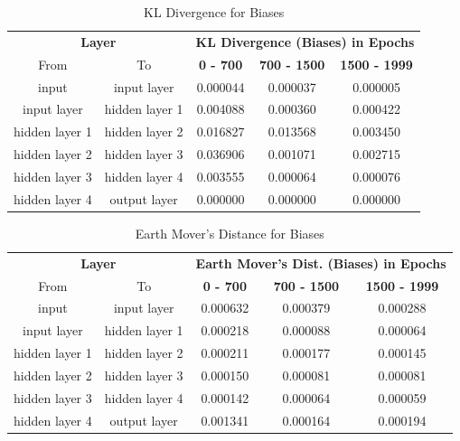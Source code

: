 \documentclass{ioereport}
\begin{document}
    \begin{table}[H]
    \caption{KL Divergence for Biases}
    \centering
    \begin{tabular}{|c|c|c|c|c|}
    \hline
    \multicolumn{2}{|c|}{\textbf{Layer}} & \multicolumn{3}{c|}{\textbf{KL Divergence (Biases) in Epochs}} \\
    \cline{1-5}
    From & To & \textbf{0 - 700} & \textbf{700 - 1500} & \textbf{1500 - 1999} \\
    \hline
    input & input layer & 0.000044 & 0.000037 & 0.000005 \\
    input layer & hidden layer 1 & 0.004088 & 0.000360 & 0.000422 \\
    hidden layer 1 & hidden layer 2 & 0.016827 & 0.013568 & 0.003450 \\
    hidden layer 2 & hidden layer 3 & 0.036906 & 0.001071 & 0.002715 \\
    hidden layer 3 & hidden layer 4 & 0.003555 & 0.000064 & 0.000076 \\
    hidden layer 4 & output layer & 0.000000 & 0.000000 & 0.000000 \\
    \hline
    \end{tabular}
    \end{table}
    
    \begin{table}[H]
    \caption{Earth Mover's Distance for Biases}
    \centering
    \begin{tabular}{|c|c|c|c|c|}
    \hline
    \multicolumn{2}{|c|}{\textbf{Layer}} & \multicolumn{3}{c|}{\textbf{Earth Mover's Dist. (Biases) in Epochs}} \\
    \cline{1-5}
    From & To & \textbf{0 - 700} & \textbf{700 - 1500} & \textbf{1500 - 1999} \\
    \hline
    input & input layer & 0.000632 & 0.000379 & 0.000288 \\
    input layer & hidden layer 1 & 0.000218 & 0.000088 & 0.000064 \\
    hidden layer 1 & hidden layer 2 & 0.000211 & 0.000177 & 0.000145 \\
    hidden layer 2 & hidden layer 3 & 0.000150 & 0.000081 & 0.000081 \\
    hidden layer 3 & hidden layer 4 & 0.000142 & 0.000064 & 0.000059 \\
    hidden layer 4 & output layer & 0.001341 & 0.000164 & 0.000194 \\
    \hline
    \end{tabular}
    \end{table}
\end{document}
